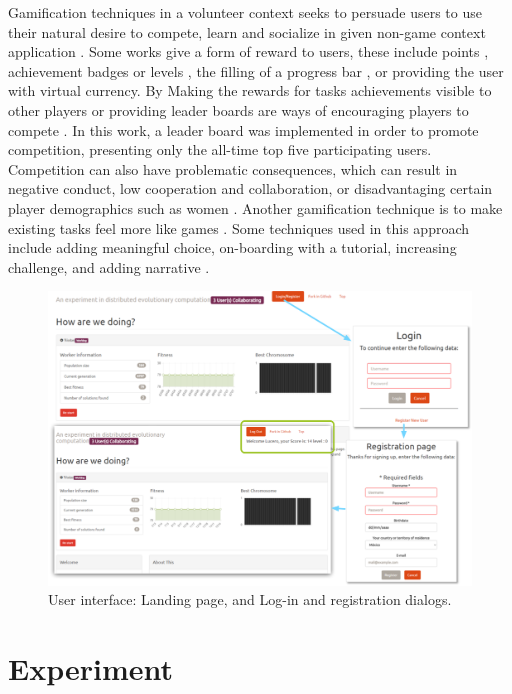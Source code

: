 \documentclass{llncs}
\begin{document}
Gamification techniques in a volunteer context seeks to persuade
users to use their natural desire to compete, learn and socialize in
given non-game context application \cite{deterding2011game,hamari2014does}.
Some works give a form of reward to users, these include
points \cite{sutter2010browse}, achievement badges or levels \cite{hamari2011framework},
the filling of a progress bar \cite{o2010get}, or providing the user with virtual currency.
By Making the rewards for  tasks achievements visible to other players or
providing leader boards are ways of encouraging players to compete \cite{hickman2010total}. In this work, a leader board was implemented in order to promote competition, presenting only the all-time top five participating users. Competition can also have problematic consequences, which can result in
negative conduct, low cooperation and collaboration, or disadvantaging certain player demographics
such as women \cite{kumar2013gamification}. Another gamification technique
is to make existing tasks feel more like games \cite{deterding2010just}.
Some techniques used in this approach include adding meaningful choice,
on-boarding with a tutorial, increasing challenge, and adding narrative \cite{mcgonigal2011reality}.



\begin{figure}[htb]
    \centering
        \includegraphics[width=5in]{img/login.png}
    \caption{ User interface: Landing page, and Log-in and registration dialogs.
    }
    \label{fig:login}
\end{figure}

\section{Experiment}
\label{sec:experiments}
\end{document}
